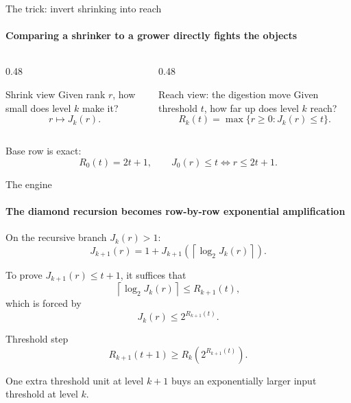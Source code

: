 \documentclass[aspectratio=169,11pt]{beamer}
\begin{document}
\begin{frame}{The trick: invert shrinking into reach}
\framesubtitle{Comparing a shrinker to a grower directly fights the objects}
\begin{columns}[T,totalwidth=\textwidth]
\begin{column}{0.48\textwidth}
\begin{block}{Shrink view}
Given rank $r$, how small does level $k$ make it?
\[
  r \longmapsto J_k(r).
\]
\end{block}
\end{column}
\begin{column}{0.48\textwidth}
\begin{block}{Reach view: the digestion move}
Given threshold $t$, how far up does level $k$ reach?
\[
  R_k(t)=\max\{r\ge 0: J_k(r)\le t\}.
\]
\end{block}
\end{column}
\end{columns}
\vspace{0.45cm}
\begin{center}
\Large Base row is exact:
\[
  R_0(t)=2t+1,
  \qquad
  J_0(r)\le t \iff r\le 2t+1.
\]
\end{center}
\end{frame}

\begin{frame}{The engine}
\framesubtitle{The diamond recursion becomes row-by-row exponential amplification}
On the recursive branch $J_k(r)>1$:
\[
  J_{k+1}(r)=1+J_{k+1}\!\left(\left\lceil\log_2 J_k(r)\right\rceil\right).
\]

To prove $J_{k+1}(r)\le t+1$, it suffices that
\[
  \left\lceil\log_2 J_k(r)\right\rceil \le R_{k+1}(t),
\]
which is forced by
\[
  J_k(r)\le 2^{R_{k+1}(t)}.
\]

\begin{block}{Threshold step}
\[
  R_{k+1}(t+1) \ge R_k\!\left(2^{R_{k+1}(t)}\right).
\]
\end{block}
\begin{center}
One extra threshold unit at level $k+1$ buys an exponentially larger input threshold at level $k$.
\end{center}
\end{frame}
\end{document}
